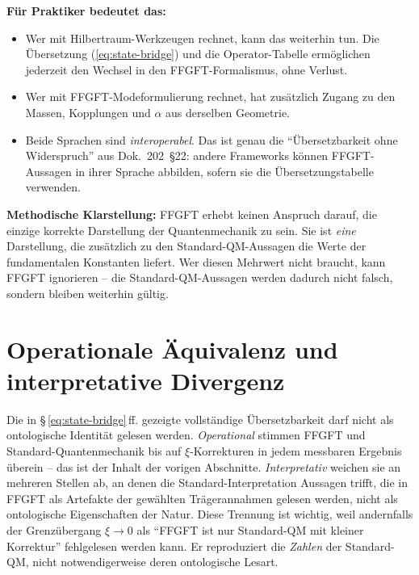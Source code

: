 \textbf{Für Praktiker bedeutet das:}
\begin{itemize}[leftmargin=2em,itemsep=2pt,topsep=2pt]
  \item Wer mit Hilbertraum-Werkzeugen rechnet, kann das weiterhin
        tun. Die Übersetzung (\ref{eq:state-bridge}) und die
        Operator-Tabelle ermöglichen jederzeit den Wechsel in den
        FFGFT-Formalismus, ohne Verlust.
  \item Wer mit FFGFT-Modeformulierung rechnet, hat zusätzlich Zugang
        zu den Massen, Kopplungen und $\alpha$ aus derselben
        Geometrie.
  \item Beide Sprachen sind \emph{interoperabel}. Das ist genau die
        \enquote{Übersetzbarkeit ohne Widerspruch} aus Dok.~202~§22:
        andere Frameworks können FFGFT-Aussagen in ihrer Sprache
        abbilden, sofern sie die Übersetzungstabelle verwenden.
\end{itemize}

\textbf{Methodische Klarstellung:} FFGFT erhebt keinen Anspruch
darauf, die einzige korrekte Darstellung der Quantenmechanik zu sein.
Sie ist \emph{eine} Darstellung, die zusätzlich zu den
Standard-QM-Aussagen die Werte der fundamentalen Konstanten liefert.
Wer diesen Mehrwert nicht braucht, kann FFGFT ignorieren -- die
Standard-QM-Aussagen werden dadurch nicht falsch, sondern bleiben
weiterhin gültig.

\section{Operationale \"Aquivalenz und interpretative Divergenz}

Die in §\,\ref{eq:state-bridge}\,ff. gezeigte vollst\"andige
\"Ubersetzbarkeit darf nicht als ontologische Identit\"at gelesen werden.
\emph{Operational} stimmen FFGFT und Standard-Quantenmechanik bis auf
$\xi$-Korrekturen in jedem messbaren Ergebnis \"uberein -- das ist der
Inhalt der vorigen Abschnitte. \emph{Interpretativ} weichen sie an
mehreren Stellen ab, an denen die Standard-Interpretation Aussagen
trifft, die in FFGFT als Artefakte der gew\"ahlten Tr\"agerannahmen
gelesen werden, nicht als ontologische Eigenschaften der Natur. Diese
Trennung ist wichtig, weil andernfalls der Grenz\"ubergang
$\xi \to 0$ als \enquote{FFGFT ist nur Standard-QM mit kleiner
Korrektur} fehlgelesen werden kann. Er reproduziert die
\emph{Zahlen} der Standard-QM, nicht notwendigerweise deren
ontologische Lesart.

